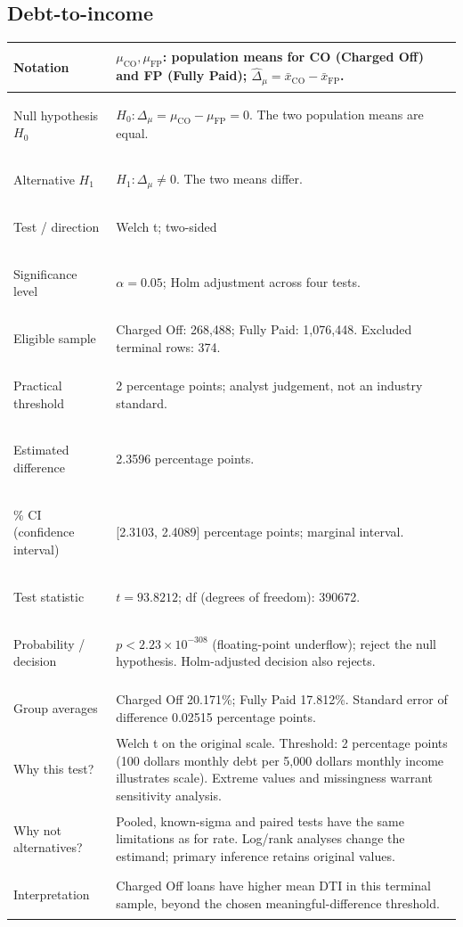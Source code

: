 \documentclass[10pt,a4paper,twocolumn]{article}
\begin{document}
\subsection{Debt-to-income}
\begin{tabularx}{\linewidth}{@{}>{\bfseries\raggedright\arraybackslash}p{.28\linewidth} X@{}}\toprule
Notation & \(\mu_{\mathrm{CO}},\mu_{\mathrm{FP}}\): population means for CO (Charged Off) and FP (Fully Paid); \(\widehat\Delta_\mu=\bar x_{\mathrm{CO}}-\bar x_{\mathrm{FP}}\).\\\midrule
Null hypothesis \(H_0\) & \(H_0:\Delta_\mu=\mu_{\mathrm{CO}}-\mu_{\mathrm{FP}}=0\). The two population means are equal.\\\midrule
Alternative \(H_1\) & \(H_1:\Delta_\mu\ne0\). The two means differ.\\\midrule
Test / direction & Welch t; two-sided\\\midrule
Significance level & \(\alpha=0.05\); Holm adjustment across four tests.\\\midrule
Eligible sample & Charged Off: 268,488; Fully Paid: 1,076,448. Excluded terminal rows: 374.\\\midrule
Practical threshold & 2 percentage points; analyst judgement, not an industry standard.\\\midrule
Estimated difference & 2.3596 percentage points.\\\midrule
95\% CI (confidence interval) & [2.3103, 2.4089] percentage points; marginal interval.\\\midrule
Test statistic & \(t=93.8212\); df (degrees of freedom): 390672.\\\midrule
Probability / decision & \(p<2.23\times10^{-308}\) (floating-point underflow); reject the null hypothesis. Holm-adjusted decision also rejects.\\\midrule
Group averages & Charged Off 20.171\%; Fully Paid 17.812\%. Standard error of difference 0.02515 percentage points.\\\midrule
Why this test? & Welch t on the original scale. Threshold: 2 percentage points (100 dollars monthly debt per 5,000 dollars monthly income illustrates scale). Extreme values and missingness warrant sensitivity analysis.\\\midrule
Why not alternatives? & Pooled, known-sigma and paired tests have the same limitations as for rate. Log/rank analyses change the estimand; primary inference retains original values.\\\midrule
Interpretation & Charged Off loans have higher mean DTI in this terminal sample, beyond the chosen meaningful-difference threshold.\\\bottomrule\end{tabularx}
\end{document}
